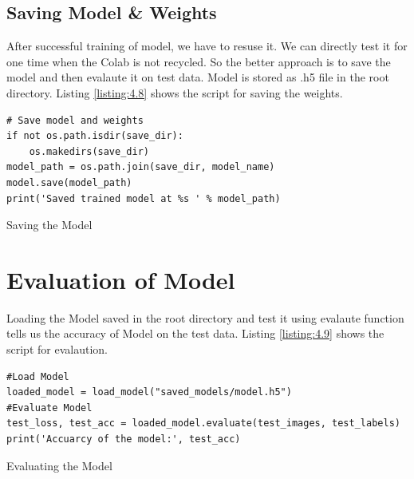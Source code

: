 \subsection{Saving Model \& Weights}
After successful training of model, we have to resuse it. We can directly test it for one time
when the Colab is not recycled. So the better approach is to save the model
and then evalaute it on test data. Model is stored as .h5 file in the root directory.
Listing \ref{listing:4.8} shows the script for saving the weights.

\begin{listing}[H]
    \begin{verbatim}
# Save model and weights
if not os.path.isdir(save_dir):
    os.makedirs(save_dir)
model_path = os.path.join(save_dir, model_name)
model.save(model_path)
print('Saved trained model at %s ' % model_path)
\end{verbatim}
\caption{Saving the Model}
\label{listing:4.8}
\end{listing}
\section{Evaluation of Model}
Loading the Model saved in the root directory and test it using evalaute function
tells us the accuracy of Model on the test data. Listing \ref{listing:4.9} shows the script for
evalaution.
\begin{longlisting}
    \begin{verbatim}
#Load Model
loaded_model = load_model("saved_models/model.h5")
#Evaluate Model
test_loss, test_acc = loaded_model.evaluate(test_images, test_labels)
print('Accuarcy of the model:', test_acc)
\end{verbatim}
\caption{Evaluating the Model}
\label{listing:4.9}
\end{longlisting}
